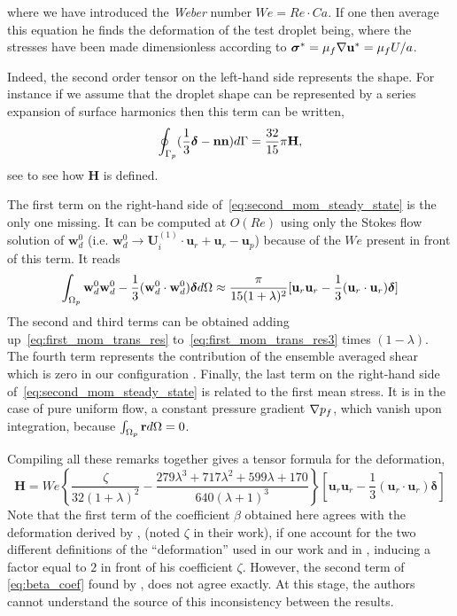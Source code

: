 where we have introduced the \textit{Weber} number $We = Re \cdot Ca$. 
If one then average this equation  he finds the deformation of the test droplet being, 
where the stresses have been made dimensionless according to $\bm\sigma^* = \mu_f \grad \textbf{u}^* = \mu_f U/a$. 

Indeed, the second order tensor on the left-hand side represents the shape. 
For instance if we assume that the droplet shape can be represented by a series expansion of surface harmonics \citep{fintzi2024averaged,nadim1996concise,nadim1991motion} then this term can be written,
\begin{equation}
    \intS[p]{ (\frac{1}{3}\bm\delta - \textbf{nn})}
    =
    \frac{32}{15} \pi \textbf{H},
\end{equation}
see \citet{fintzi2024averaged} to see how \textbf{H} is defined. 

The first term on the right-hand side of~\ref{eq:second_mom_steady_state} is the only one missing. 
It can be computed at $O(Re)$ using only the Stokes flow solution of $\textbf{w}_d^0$ (i.e. $\textbf{w}_d^0 \to \textbf{U}^{(1)}_i\cdot \textbf{u}_r + \textbf{u}_r - \textbf{u}_p$) because of the $We$ present in front of this term. It reads
\begin{equation}
    \intO[p]{
        \textbf{w}_d^0  \textbf{w}_d^0 
        -\frac{1}{3} (\textbf{w}_d^0 \cdot  \textbf{w}_d^0) \bm\delta
    }
    \approx \frac{\pi}{15(1+\lambda)^2}   [
        \textbf{u}_r\textbf{u}_r-\frac{1}{3}(\textbf{u}_r\cdot\textbf{u}_r)\bm\delta
    ]
\end{equation}
The second and third terms can be obtained adding up~\ref{eq:first_mom_trans_res} to~\ref{eq:first_mom_trans_res3} times $(1-\lambda)$. 
The fourth term represents the contribution of the ensemble averaged shear which is zero in our configuration . 
Finally, the last term on the right-hand side of~\ref{eq:second_mom_steady_state} is related to the first mean stress.
It is in the case of pure uniform flow, a constant pressure gradient $\grad p_f$, which vanish upon integration, because  $\intO[p]{\textbf{r}} =0$. 

Compiling all these remarks together gives a tensor formula for the deformation, 
\begin{equation}
    \textbf{H}
    = 
    We  \left\{
        \frac{\zeta}{32(1+\lambda)^2}
        - \frac{279\lambda^3+717\lambda^2+599\lambda+170}{640(\lambda+1)^3} 
    \right\}[
        \textbf{u}_r\textbf{u}_r - \frac{1}{3}(\textbf{u}_r\cdot \textbf{u}_r)\bm\delta
    ]
    \label{eq:beta_coef}
\end{equation}
Note that the first term of the coefficient $\beta$ obtained here agrees with the deformation derived by \citet{taylor1964deformation}, (noted $\zeta$ in their work), if one account for the two different definitions of the ``deformation'' used in our work and in \citet{taylor1964deformation}, inducing a factor equal to $2$ in front of his coefficient $\zeta$.
However, the second term of \ref{eq:beta_coef} found by \citet{taylor1964deformation}, does not agree exactly.
At this stage, the authors cannot understand the source of this inconsistency between the results.

